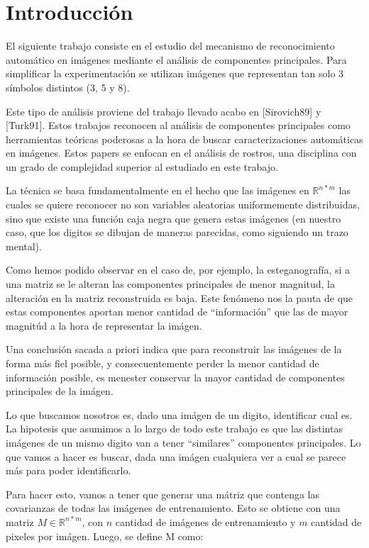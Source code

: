 \section{Introducci\'on}

El siguiente trabajo consiste en el estudio del mecanismo de reconocimiento autom\'atico 
en im\'agenes mediante el an\'alisis de componentes principales. Para simplificar la
experimentaci\'on se utilizan im\'agenes que representan tan solo 3 s\'imbolos distintos
(3, 5 y 8).

Este tipo de an\'alisis proviene del trabajo llevado acabo en [Sirovich89] y [Turk91]. Estos
trabajos reconocen al an\'alisis de componentes principales como herramientas te\'oricas poderosas
a la hora de buscar caracterizaciones autom\'aticas en im\'agenes. Estos papers se enfocan en el
an\'alisis de rostros, una disciplina con un grado de complejidad superior al estudiado en este
trabajo. 

La t\'ecnica se basa fundamentalmente en el hecho que las im\'agenes en $\mathbb{R}^{n * m}$ las cuales se
quiere reconocer no son variables aleatorias uniformemente distribuidas, sino que existe una funci\'on caja 
negra que genera estas im\'agenes (en nuestro caso, que los digitos se dibujan de maneras parecidas, 
como siguiendo un trazo mental).

Como hemos podido observar en el caso de, por ejemplo, la esteganograf\'ia, si a una matriz se le alteran
las componentes principales de menor magnitud, la alteraci\'on en la matriz reconstruida es baja. 
Este fen\'omeno nos la pauta de que estas componentes aportan menor cantidad de ``informaci\'on'' 
que las de mayor magnit\'ud a la hora de representar la im\'agen.

Una conclusi\'on sacada a priori indica que para reconstruir las im\'agenes de la forma m\'as fiel posible,
y consecuentemente perder la menor cantidad de informaci\'on posible, es menester conservar la mayor cantidad
de componentes principales de la im\'agen. 

Lo que buscamos nosotros es, dado una im\'agen de un digito, identificar cual es. La hipotesis
que asumimos a lo largo de todo este trabajo es que las distintas im\'agenes de un mismo digito van 
a tener ``similares'' componentes principales. Lo que vamos a hacer es buscar, dada una im\'agen cualquiera
ver a cual se parece m\'as para poder identificarlo.

Para hacer esto, vamos a tener que generar una m\'atriz que contenga las covarianzas de todas las
im\'agenes de entrenamiento. Esto se obtiene con una matriz $M \in \mathbb{R}^{n * m}$, con $n$ cantidad
de im\'agenes de entrenamiento y $m$ cantidad de pixeles por im\'agen. Luego, se define M como:

